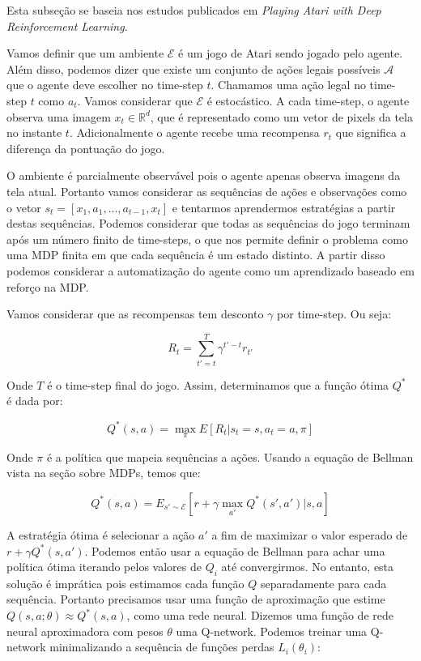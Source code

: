 \documentclass[a4paper,10pt]{article}
\theoremstyle{plain}
\begin{document}
Esta subseção se baseia nos estudos publicados em \textit{Playing Atari with Deep Reinforcement
Learning}\cite{dqn}.

Vamos definir que um ambiente $\mathcal{E}$ é um jogo de Atari sendo jogado pelo agente. Além
disso, podemos dizer que existe um conjunto de ações legais possíveis $\mathcal{A}$ que o agente
deve escolher no time-step $t$. Chamamos uma ação legal no time-step $t$ como $a_t$. Vamos
considerar que $\mathcal{E}$ é estocástico. A cada time-step, o agente observa uma imagem $x_t \in
\mathbb{R}^d$, que é representado como um vetor de pixels da tela no instante $t$. Adicionalmente
o agente recebe uma recompensa $r_t$ que significa a diferença da pontuação do jogo.

O ambiente é parcialmente observável pois o agente apenas observa imagens da tela atual. Portanto
vamos considerar as sequências de ações e observações como o vetor $s_t=[x_1,a_1,...,a_{t-1},x_t]$
e tentarmos aprendermos estratégias a partir destas sequências. Podemos considerar que todas as
sequências do jogo terminam após um número finito de time-steps, o que nos permite definir o
problema como uma MDP finita em que cada sequência é um estado distinto. A partir disso podemos
considerar a automatização do agente como um aprendizado baseado em reforço na MDP.

Vamos considerar que as recompensas tem desconto $\gamma$ por time-step. Ou seja:

\begin{equation*}
  R_t = \sum_{t'=t}^T \gamma^{t'-t}r_{t'}
\end{equation*}

Onde $T$ é o time-step final do jogo. Assim, determinamos que a função ótima $Q^*$ é dada por:

\begin{equation*}
  Q^*(s,a) = \max_\pi E[R_t|s_t=s, a_t=a, \pi]
\end{equation*}

Onde $\pi$ é a política que mapeia sequências a ações. Usando a equação de Bellman vista na seção
sobre MDPs, temos que:

\begin{equation*}
  Q^*(s,a) = E_{s' \sim \mathcal{E}} \left[r+\gamma\max_{a'}Q^*(s',a')|s,a\right]
\end{equation*}

A estratégia ótima é selecionar a ação $a'$ a fim de maximizar o valor esperado de $r+\gamma Q^*(s,
a')$. Podemos então usar a equação de Bellman para achar uma política ótima iterando pelos valores
de $Q_i$ até convergirmos. No entanto, esta solução é imprática pois estimamos cada função $Q$
separadamente para cada sequência. Portanto precisamos usar uma função de aproximação que estime
$Q(s,a;\theta) \approx Q^*(s,a)$, como uma rede neural. Dizemos uma função de rede neural
aproximadora com pesos $\theta$ uma Q-network. Podemos treinar uma Q-network minimalizando a
sequência de funções perdas $L_i(\theta_i)$:
\end{document}
